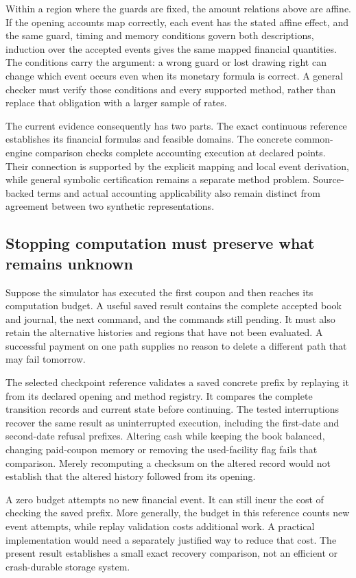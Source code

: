 Within a region where the guards are fixed, the amount relations above are affine. If the opening accounts map correctly, each event has the stated affine effect, and the same guard, timing and memory conditions govern both descriptions, induction over the accepted events gives the same mapped financial quantities. The conditions carry the argument: a wrong guard or lost drawing right can change which event occurs even when its monetary formula is correct. A general checker must verify those conditions and every supported method, rather than replace that obligation with a larger sample of rates.

The current evidence consequently has two parts. The exact continuous reference establishes its financial formulas and feasible domains. The concrete common-engine comparison checks complete accounting execution at declared points. Their connection is supported by the explicit mapping and local event derivation, while general symbolic certification remains a separate method problem. Source-backed terms and actual accounting applicability also remain distinct from agreement between two synthetic representations.

\subsection{Stopping computation must preserve what remains unknown}

Suppose the simulator has executed the first coupon and then reaches its computation budget. A useful saved result contains the complete accepted book and journal, the next command, and the commands still pending. It must also retain the alternative histories and regions that have not been evaluated. A successful payment on one path supplies no reason to delete a different path that may fail tomorrow.

The selected checkpoint reference validates a saved concrete prefix by replaying it from its declared opening and method registry. It compares the complete transition records and current state before continuing. The tested interruptions recover the same result as uninterrupted execution, including the first-date and second-date refusal prefixes. Altering cash while keeping the book balanced, changing paid-coupon memory or removing the used-facility flag fails that comparison. Merely recomputing a checksum on the altered record would not establish that the altered history followed from its opening.

A zero budget attempts no new financial event. It can still incur the cost of checking the saved prefix. More generally, the budget in this reference counts new event attempts, while replay validation costs additional work. A practical implementation would need a separately justified way to reduce that cost. The present result establishes a small exact recovery comparison, not an efficient or crash-durable storage system.

